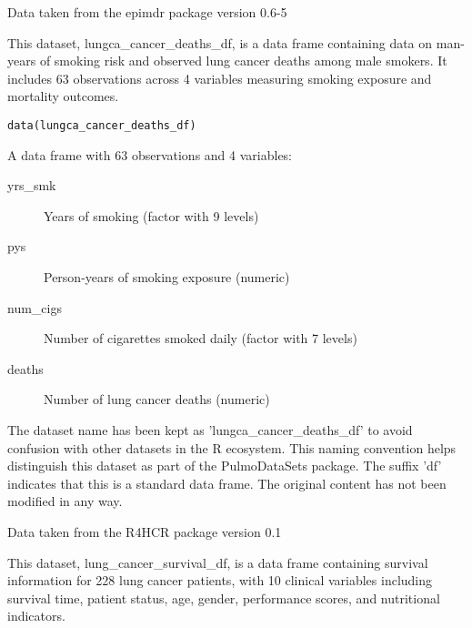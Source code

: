 \documentclass[a4paper]{book}
\begin{document}
%
\begin{Source}
Data taken from the epimdr package version 0.6-5
\end{Source}
%
\begin{Description}
This dataset, lungca\_cancer\_deaths\_df, is a data frame containing data on
man-years of smoking risk and observed lung cancer deaths among male smokers.
It includes 63 observations across 4 variables measuring smoking exposure
and mortality outcomes.
\end{Description}
%
\begin{Usage}
\begin{verbatim}
data(lungca_cancer_deaths_df)
\end{verbatim}
\end{Usage}
%
\begin{Format}
A data frame with 63 observations and 4 variables:
\begin{description}

\item[yrs\_smk] Years of smoking (factor with 9 levels)
\item[pys] Person-years of smoking exposure (numeric)
\item[num\_cigs] Number of cigarettes smoked daily (factor with 7 levels)
\item[deaths] Number of lung cancer deaths (numeric)

\end{description}

\end{Format}
%
\begin{Details}
The dataset name has been kept as 'lungca\_cancer\_deaths\_df' to avoid confusion
with other datasets in the R ecosystem. This naming convention helps distinguish
this dataset as part of the PulmoDataSets package. The suffix 'df' indicates
that this is a standard data frame. The original content has not been modified
in any way.
\end{Details}
%
\begin{Source}
Data taken from the R4HCR package version 0.1
\end{Source}
%
\begin{Description}
This dataset, lung\_cancer\_survival\_df, is a data frame containing survival information
for 228 lung cancer patients, with 10 clinical variables including survival time,
patient status, age, gender, performance scores, and nutritional indicators.
\end{Description}
\end{document}
